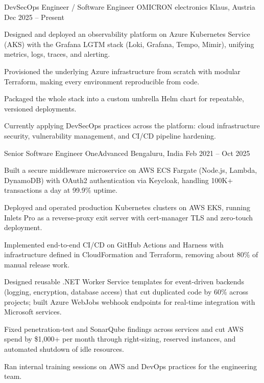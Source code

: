 \documentclass[11pt, a4paper]{awesome-cv}
\begin{document}
\begin{cventries}

  \cventry
    {DevSecOps Engineer / Software Engineer}
    {OMICRON electronics}
    {Klaus, Austria}
    {Dec 2025 -- Present}
    {
      \begin{cvitems}
        \item {Designed and deployed an observability platform on Azure Kubernetes Service (AKS) with the Grafana LGTM stack (Loki, Grafana, Tempo, Mimir), unifying metrics, logs, traces, and alerting.}
        \item {Provisioned the underlying Azure infrastructure from scratch with modular Terraform, making every environment reproducible from code.}
        \item {Packaged the whole stack into a custom umbrella Helm chart for repeatable, versioned deployments.}
        \item {Currently applying DevSecOps practices across the platform: cloud infrastructure security, vulnerability management, and CI/CD pipeline hardening.}
      \end{cvitems}
    }

  \cventry
    {Senior Software Engineer}
    {OneAdvanced}
    {Bengaluru, India}
    {Feb 2021 -- Oct 2025}
    {
      \begin{cvitems}
        \item {Built a secure middleware microservice on AWS ECS Fargate (Node.js, Lambda, DynamoDB) with OAuth2 authentication via Keycloak, handling 100K+ transactions a day at 99.9\% uptime.}
        \item {Deployed and operated production Kubernetes clusters on AWS EKS, running Inlets Pro as a reverse-proxy exit server with cert-manager TLS and zero-touch deployment.}
        \item {Implemented end-to-end CI/CD on GitHub Actions and Harness with infrastructure defined in CloudFormation and Terraform, removing about 80\% of manual release work.}
        \item {Designed reusable .NET Worker Service templates for event-driven backends (logging, encryption, database access) that cut duplicated code by 60\% across projects; built Azure WebJobs webhook endpoints for real-time integration with Microsoft services.}
        \item {Fixed penetration-test and SonarQube findings across services and cut AWS spend by \$1,000+ per month through right-sizing, reserved instances, and automated shutdown of idle resources.}
        \item {Ran internal training sessions on AWS and DevOps practices for the engineering team.}
      \end{cvitems}
    }


\end{cventries}
\end{document}
